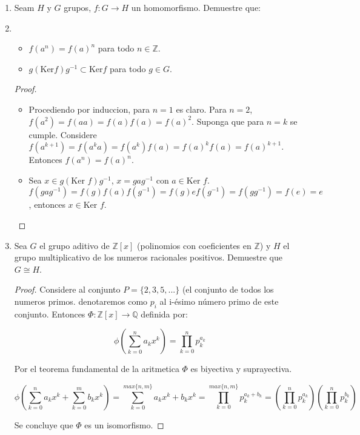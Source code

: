 \documentclass{article}
\theoremstyle{break}
\begin{document}
\begin{enumerate}
		\item Seam $H$ y $G$ grupos, $f:G\rightarrow H$ un homomorfismo. Demuestre que:
		
		\item
		\begin{itemize}
			\item $f(a^n)=f(a)^n$ para todo $n\in \mathbb{Z}$.
			\item $g(\mbox{Ker}f)g^{-1}\subset\mbox{Ker}f$ para todo $g\in G$.
		\end{itemize}
		
		\begin{proof}
			
			\begin{itemize}
				\item Procediendo por induccion, para $n=1$ es claro. Para $n=2$, $f(a^2)=f(aa)=f(a)f(a)=f(a)^2$. Suponga que para $n=k$ se cumple. Considere $f(a^{k+1})=f(a^ka)=f(a^k)f(a)=f(a)^kf(a)=f(a)^{k+1}$. Entonces $f(a^n)=f(a)^n$.
				
				\item Sea $x\in g(\mbox{Ker }f)g^{-1}$, $x=gag^{-1}$ con $a\in \mbox{Ker }f$. $f(gag^{-1})=f(g)f(a)f(g^{-1})=f(g)ef(g^{-1})=f(gg^{-1})=f(e)=e$, entonces $x\in \mbox{Ker }f$. 
			\end{itemize}
		\end{proof}
		
		\item Sea $G$ el grupo aditivo de $\mathbb{Z}[x]$ (polinomios con coeficientes en $\mathbb{Z}$) y $H$ el grupo multiplicativo de los numeros racionales  positivos. Demuestre que $G\cong H$.
		
		\begin{proof}
			Considere al conjunto $P=\{2,3,5,...\}$ (el conjunto de todos los numeros primos. denotaremos como $p_i$ al i-\'esimo n\'umero primo de este conjunto. Entonces $\Phi:\mathbb{Z}[x]\rightarrow \mathbb{Q}$ definida por:
			
			$$
			\phi(\displaystyle\sum_{k=0}^{n}{a_kx^k})=\prod_{k=0}^{n}{p_k^{a_k}}
			$$
			
			Por el teorema fundamental de la aritmetica $\Phi$ es biyectiva y suprayectiva.
			
			$$
			\phi(\displaystyle\sum_{k=0}^{n}{a_kx^k}+\displaystyle\sum_{k=0}^{m}{b_kx^k})=\displaystyle\sum_{k=0}^{max\{n,m\}}{a_kx^k+b_kx^k}=\prod_{k=0}^{max\{n,m\}}{p_k^{a_k+b_k}}=(\prod_{k=0}^{n}{p_k^{a_k}})(\prod_{k=0}^{n}{p_k^{b_k}})
			$$
			
			Se concluye que $\Phi$ es un isomorfismo.
			

\end{proof}
\end{enumerate}
\end{document}
